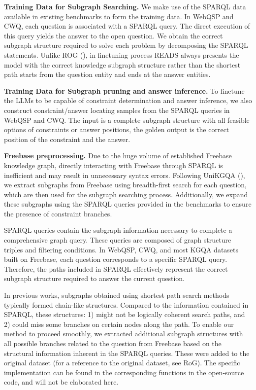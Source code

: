 \documentclass[11pt]{article}
\begin{document}
\textbf{Training Data for Subgraph Searching.} We make use of the SPARQL data available in existing benchmarks to form the training data. In WebQSP and CWQ, each question is associated with a SPARQL query. The direct execution of this query yields the answer to the open question. We obtain the correct subgraph structure required to solve each problem by decomposing the SPARQL statements. Unlike ROG (\citealp{rog}), in finetuning process READS always presents the model with the correct knowledge subgraph structure rather than the shortest path starts from the question entity and ends at the answer entities.

\noindent\textbf{Training Data for Subgraph pruning and answer inference.} To finetune the LLMs to be capable of constraint determination and answer inference, we also construct constraint/answer locating samples from the SPARQL queries in WebQSP and CWQ. The input is a complete subgraph structure with all feasible options of constraints or answer positions, the golden output is the correct position of the constraint and the answer.

\noindent\textbf{Freebase preprocessing.} Due to the huge volume of established Freebase knowledge graph, directly interacting with Freebase through SPARQL is inefficient and may result in unnecessary syntax errors. Following UniKGQA (\citealp{jiang2022unikgqa}), we extract subgraphs from Freebase using breadth-first search for each question, which are then used for the subgraph searching process. Additionally, we expand these subgraphs using the SPARQL queries provided in the benchmarks to ensure the presence of constraint branches.

SPARQL queries contain the subgraph information necessary to complete a comprehensive graph query. These queries are composed of graph structure triples and filtering conditions. In WebQSP, CWQ, and most KGQA datasets built on Freebase, each question corresponds to a specific SPARQL query. Therefore, the paths included in SPARQL effectively represent the correct subgraph structure required to answer the current question.

In previous works, subgraphs obtained using shortest path search methods typically formed chain-like structures. Compared to the information contained in SPARQL, these structures: 1) might not be logically coherent search paths, and 2) could miss some branches on certain nodes along the path. To enable our method to proceed smoothly, we extracted additional subgraph structures with all possible branches related to the question from Freebase based on the structural information inherent in the SPARQL queries. These were added to the original dataset (for a reference to the original dataset, see RoG). The specific implementation can be found in the corresponding functions in the open-source code, and will not be elaborated here. 
\end{document}
